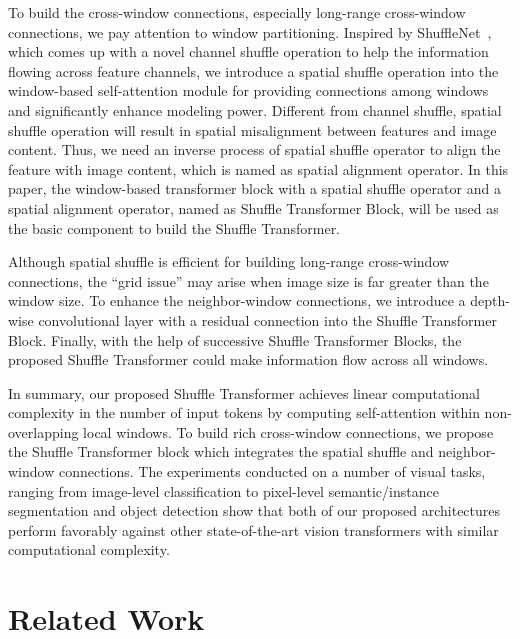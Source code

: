 \documentclass{article}
\begin{document}
To build the cross-window connections, especially long-range cross-window connections, we pay attention to window partitioning. Inspired by ShuffleNet~\cite{zhang2018shufflenet}, which comes up with a novel channel shuffle operation to help the information flowing across feature channels, we introduce a spatial shuffle operation into the window-based self-attention module for providing connections among windows and significantly enhance modeling power. Different from channel shuffle, spatial shuffle operation will result in spatial misalignment between features and image content. Thus, we need an inverse process of spatial shuffle operator to align the feature with image content, which is named as spatial alignment operator. In this paper, the window-based transformer block with a spatial shuffle operator and a spatial alignment operator, named as Shuffle Transformer Block, will be used as the basic component to build the Shuffle Transformer. 

Although spatial shuffle is efficient for building long-range cross-window connections, the “grid issue” may arise when image size is far greater than the window size. To enhance the neighbor-window connections, we introduce a depth-wise convolutional layer with a residual connection into the Shuffle Transformer Block. Finally, with the help of successive Shuffle Transformer Blocks, the proposed Shuffle Transformer could make information flow across all windows.

In summary, our proposed Shuffle Transformer achieves linear computational complexity in the number of input tokens by computing self-attention within non-overlapping local windows. To build rich cross-window connections, we propose the Shuffle Transformer block which integrates the spatial shuffle and neighbor-window connections. The experiments conducted on a number of visual tasks, ranging from image-level
classification to pixel-level semantic/instance segmentation and object detection show that both of our proposed architectures perform favorably against other state-of-the-art vision transformers with similar computational complexity.


\section{Related Work}
\end{document}
